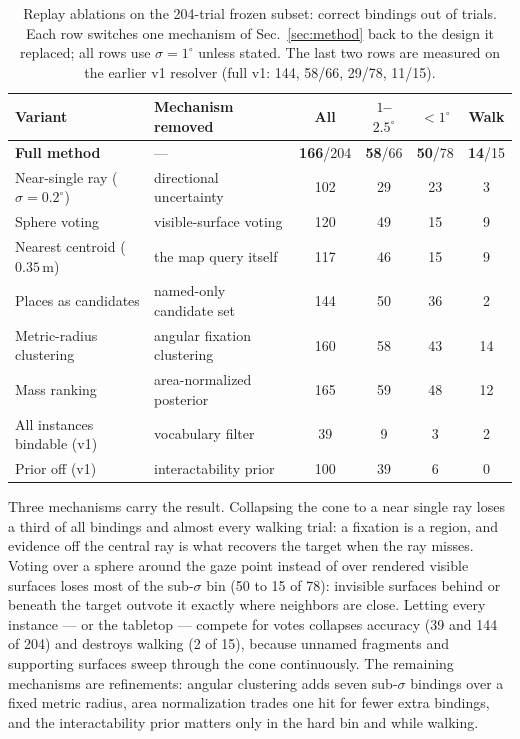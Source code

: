 \begin{table}[t]
    \centering
    \caption{Replay ablations on the 204-trial frozen subset: correct
    bindings out of trials. Each row switches one mechanism of
    Sec.~\ref{sec:method} back to the design it replaced; all rows use
    $\sigma=1^\circ$ unless stated. The last two rows are measured on the
    earlier v1 resolver (full v1: 144, 58/66, 29/78, 11/15).}
    \label{tab:ablations}
    \scriptsize
    \setlength{\tabcolsep}{3pt}
    \renewcommand{\arraystretch}{1.15}
    \begin{tabular}{llcccc}
        \hline
        Variant & Mechanism removed & All & $1$--$2.5^\circ$ & $<1^\circ$ & Walk \\
        \hline
        \textbf{Full method} & --- & \textbf{166}/204 & \textbf{58}/66 & \textbf{50}/78 & \textbf{14}/15 \\
        Near-single ray ($\sigma{=}0.2^\circ$) & directional uncertainty & 102 & 29 & 23 & 3 \\
        Sphere voting & visible-surface voting & 120 & 49 & 15 & 9 \\
        Nearest centroid ($0.35$\,m) & the map query itself & 117 & 46 & 15 & 9 \\
        Places as candidates & named-only candidate set & 144 & 50 & 36 & 2 \\
        Metric-radius clustering & angular fixation clustering & 160 & 58 & 43 & 14 \\
        Mass ranking & area-normalized posterior & 165 & 59 & 48 & 12 \\
        \hline
        All instances bindable (v1) & vocabulary filter & 39 & 9 & 3 & 2 \\
        Prior off (v1) & interactability prior & 100 & 39 & 6 & 0 \\
        \hline
    \end{tabular}
\end{table}

Three mechanisms carry the result. Collapsing the cone to a near
single ray loses a third of all bindings and almost every walking
trial: a fixation is a region, and evidence off the central ray is
what recovers the target when the ray misses. Voting over a sphere
around the gaze point instead of over rendered visible surfaces
loses most of the sub-$\sigma$ bin (50 to 15 of 78): invisible
surfaces behind or beneath the target outvote it exactly where
neighbors are close. Letting every instance --- or the tabletop ---
compete for votes collapses accuracy (39 and 144 of 204) and
destroys walking (2 of 15), because unnamed fragments and supporting
surfaces sweep through the cone continuously. The remaining
mechanisms are refinements: angular clustering adds seven sub-$\sigma$
bindings over a fixed metric radius, area normalization trades one
hit for fewer extra bindings, and the interactability prior matters
only in the hard bin and while walking.


